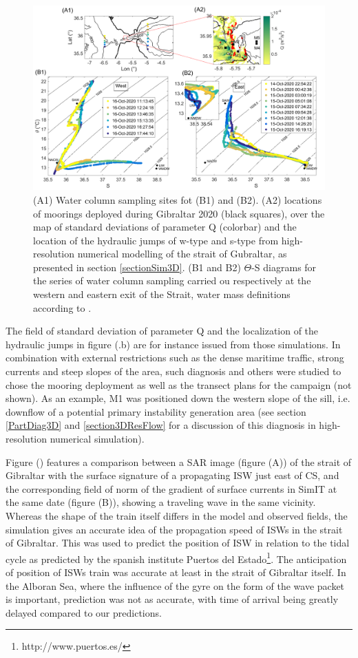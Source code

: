  
\begin{figure}[!h]
 \includegraphics[width=\textwidth]{./GBR3D/Fig_Moor.png}
 \caption {(A1) Water column sampling sites fot (B1) and (B2). (A2) locations of moorings deployed during Gibraltar 2020 (black squares), over the map of standard deviations of parameter Q (colorbar) and the location of the hydraulic jumps of w-type and s-type from high-resolution numerical modelling of the strait of Gubraltar, as presented in section \ref{sectionSim3D}. (B1 and B2) $\Theta$-S diagrams for the series of water column sampling carried ou respectively at the western and eastern exit of the Strait, water mass definitions according to \citet{Naranjo2015}.}
 \label{fig_moor}
\end{figure}

The field of standard deviation of parameter Q and the localization of the hydraulic jumps in figure (.b) are for instance issued from those simulations. In combination with external restrictions such as the dense maritime traffic, strong currents and steep slopes of the area, such diagnosis and others were studied to chose the mooring deployment as well as the transect plans for the campaign (not shown). As an example, M1 was positioned down the western slope of the sill, i.e. downflow of a potential primary instability generation area (see section \ref{PartDiag3D} and \ref{section3DResFlow} for a discussion of this diagnosis in high-resolution numerical simulation).

Figure () features a comparison between a SAR image (figure (A)) of the strait of Gibraltar with the surface signature of a propagating ISW just east of CS, and the corresponding field of norm of the gradient of surface currents in SimIT at the same date (figure (B)), showing a traveling wave in the same vicinity. Whereas the shape of the train itself differs in the model and observed fields, the simulation gives an accurate idea of the propagation speed of ISWs in the strait of Gibraltar. This was used to predict the position of ISW in relation to the tidal cycle as predicted by the spanish institute Puertos del Estado\footnote{http://www.puertos.es/}. The anticipation of position of ISWs train was accurate at least in the strait of Gibraltar itself. In the Alboran Sea, where the influence of the gyre on the form of the wave packet is important, prediction was not as accurate, with time of arrival being greatly delayed compared to our predictions. 

